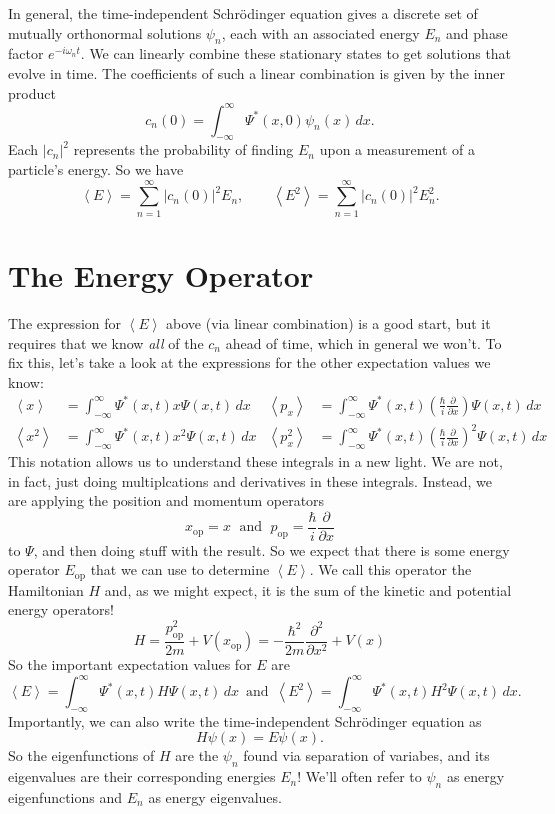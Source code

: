\documentclass[../p052main.tex]{subfiles}
\begin{document}
\vspace{-5pt}
\begin{summary}
    In general, the time-independent Schrödinger equation gives a discrete set of mutually orthonormal solutions $\psi_n$, each with an associated energy $E_n$ and phase factor $e^{-i \omega_n t}$.
    We can linearly combine these stationary states to get solutions that evolve in time.
    The coefficients of such a linear combination is given by the inner product
    \[ c_n(0) = \int_{-\infty}^{\infty} \Psi^*(x,0)\psi_n(x) \,dx. \]
    Each $|c_n|^2$ represents the probability of finding $E_n$ upon a measurement of a particle's energy.
    So we have
    \[ \left< E \right> = \sum_{n=1}^{\infty} |c_n(0)|^2 E_n, \qquad \left< E^2 \right> = \sum_{n=1}^{\infty} |c_n(0)|^2 E_n^2. \]
\end{summary}

\section{The Energy Operator}
The expression for $\left< E \right>$ above (via linear combination) is a good start, but it requires that we know \textit{all} of the $c_n$ ahead of time, which in general we won't.
To fix this, let's take a look at the expressions for the other expectation values we know:
\begin{align*}
    \left< x \right> &= \int_{-\infty}^{\infty} \Psi^*(x,t) x \Psi(x,t) \,dx & \left< p_x \right> &= \int_{-\infty}^{\infty} \Psi^*(x,t) \left( \frac{\hbar}{i} \frac{\partial}{\partial x} \right) \Psi(x,t) \,dx \\
    \left< x^2 \right> &= \int_{-\infty}^{\infty} \Psi^*(x,t) x^2 \Psi(x,t) \,dx & \left< p_x^2 \right> &= \int_{-\infty}^{\infty} \Psi^*(x,t) \left( \frac{\hbar}{i} \frac{\partial}{\partial x} \right)^2 \Psi(x,t) \,dx
\end{align*}
This notation allows us to understand these integrals in a new light.
We are not, in fact, just doing multiplcations and derivatives in these integrals.
Instead, we are applying the position and momentum operators
\[ x_\textrm{op} = x \;\text{ and }\; p_\textrm{op} = \frac{\hbar}{i} \frac{\partial}{\partial x} \]
to $\Psi$, and then doing stuff with the result.
So we expect that there is some energy operator $E_\textrm{op}$ that we can use to determine $\left< E \right>$.
We call this operator the Hamiltonian $H$ and, as we might expect, it is the sum of the kinetic and potential energy operators!
\[ H = \frac{p_\textrm{op}^2}{2m} + V(x_\textrm{op}) = -\frac{\hbar^2}{2m}\frac{\partial^2}{\partial x^2} + V(x) \]
So the important expectation values for $E$ are
\[ \left< E \right> = \int_{-\infty}^{\infty} \Psi^*(x,t) H \Psi(x,t) \,dx \,\text{ and }\, \left< E^2 \right> = \int_{-\infty}^{\infty} \Psi^*(x,t) H^2 \Psi(x,t) \,dx. \]
Importantly, we can also write the time-independent Schrödinger equation as
\[ H \psi(x) = E \psi(x). \]
So the eigenfunctions of $H$ are the $\psi_n$ found via separation of variabes, and its eigenvalues are their corresponding energies $E_n$!
We'll often refer to $\psi_n$ as energy eigenfunctions and $E_n$ as energy eigenvalues.
\end{document}
